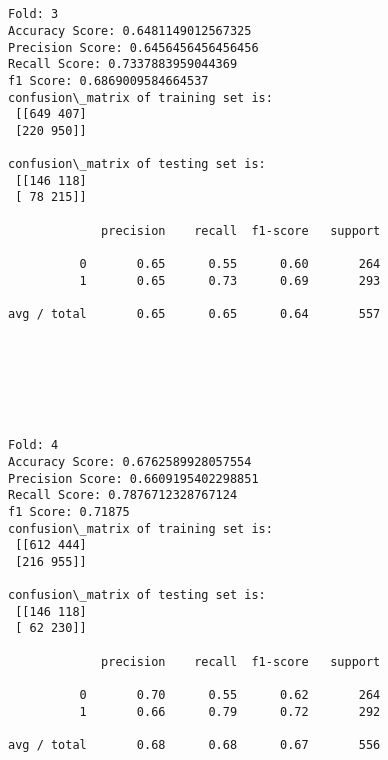 \documentclass[11pt]{article}
\begin{document}
    \begin{center}
    \end{center}
    { \hspace*{\fill} \\}
    
    \begin{Verbatim}[commandchars=\\\{\}]

Fold: 3
Accuracy Score: 0.6481149012567325
Precision Score: 0.6456456456456456
Recall Score: 0.7337883959044369
f1 Score: 0.6869009584664537
confusion\_matrix of training set is: 
 [[649 407]
 [220 950]] 

confusion\_matrix of testing set is: 
 [[146 118]
 [ 78 215]] 

             precision    recall  f1-score   support

          0       0.65      0.55      0.60       264
          1       0.65      0.73      0.69       293

avg / total       0.65      0.65      0.64       557


    \end{Verbatim}

    \begin{center}
    \end{center}
    { \hspace*{\fill} \\}
    
    \begin{center}
    \end{center}
    { \hspace*{\fill} \\}
    
    \begin{Verbatim}[commandchars=\\\{\}]

Fold: 4
Accuracy Score: 0.6762589928057554
Precision Score: 0.6609195402298851
Recall Score: 0.7876712328767124
f1 Score: 0.71875
confusion\_matrix of training set is: 
 [[612 444]
 [216 955]] 

confusion\_matrix of testing set is: 
 [[146 118]
 [ 62 230]] 

             precision    recall  f1-score   support

          0       0.70      0.55      0.62       264
          1       0.66      0.79      0.72       292

avg / total       0.68      0.68      0.67       556


    \end{Verbatim}
\end{document}
